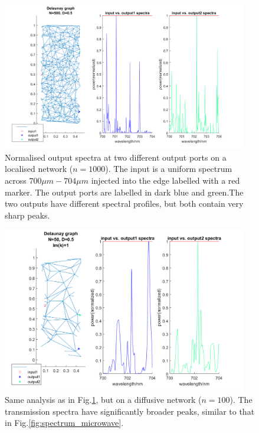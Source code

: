 \begin{figure}[hbp]
  \centering
    \includegraphics[width=0.95\textwidth]{ch3/fig3/example2_spectra_N500D05d.png}
    \caption{Normalised output spectra at two different output ports on a localised network ($n=1000$). The input is a uniform spectrum across $700\mu m-704\mu m$ injected into the edge labelled with a red marker. The output ports are labelled in dark blue and green.The two outputs have different spectral profiles, but both contain very sharp peaks.} 
    \label{fig:spectrum_localised}
\end{figure}


\begin{figure}[h]
  \centering
    \includegraphics[width=0.95\textwidth]{ch3/fig3/example2_spectra_N50D05d.png}
    \caption{Same analysis as in Fig.\ref{fig:spectrum_localised}, but on a diffusive network ($n=100$). The transmission spectra have significantly broader peaks, similar to that in Fig.\ref{fig:spectrum_microwave}.} 
    \label{fig:spectrum_diffusive}
\end{figure}



